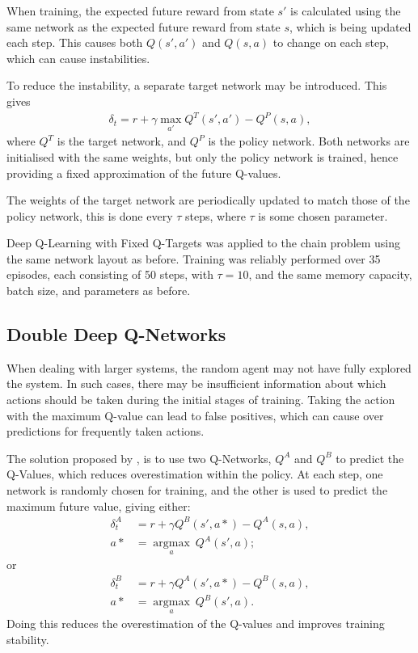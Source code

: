 When training, the expected future reward from state $s'$ is calculated using
the same network as the expected future reward from state $s$, which is being
updated each step.
This causes both $Q(s',a')$ and $Q(s,a)$ to change on each step, which can cause
instabilities.

To reduce the instability, a separate target network may be introduced.
This gives
\begin{align*}
    \delta_t = r + \gamma\max_{a'}Q^T(s',a') - Q^P(s,a),
\end{align*}
where $Q^T$ is the target network, and $Q^P$ is the policy network.
Both networks are initialised with the same weights, but only the policy network
is trained, hence providing a fixed approximation of the future Q-values.

The weights of the target network are periodically updated to match those of the
policy network, this is done every $\tau$ steps, where $\tau$ is some chosen
parameter.

Deep Q-Learning with Fixed Q-Targets was applied to the chain problem using the
same network layout as before.
Training was reliably performed over 35 episodes, each consisting of 50 steps,
with $\tau = 10$, and the same memory capacity, batch size, and parameters as
before.



\subsection{Double Deep Q-Networks}

When dealing with larger systems, the random agent may not have fully explored
the system.
In such cases, there may be insufficient information about which actions should
be taken during the initial stages of training.
Taking the action with the maximum Q-value can lead to false positives, which
can cause over predictions for frequently taken actions.

The solution proposed by \cite{Hasselt:2010:Double}, is to use two Q-Networks,
$Q^A$ and $Q^B$ to predict the Q-Values, which reduces overestimation within the
policy.
At each step, one network is randomly chosen for training, and the other is used
to predict the maximum future value, giving either:
\begin{align*}
    \delta_t^A &= r + \gamma Q^B(s',a*) - Q^A(s,a),\\
    a* &= \underset{a}{\operatorname{argmax}}\ Q^A(s',a);
\end{align*}
or
\begin{align*}
    \delta_t^B &= r + \gamma Q^A(s',a*) - Q^B(s,a),\\
    a* &= \underset{a}{\operatorname{argmax}}\ Q^B(s',a).
\end{align*}
Doing this reduces the overestimation of the Q-values and improves training
stability.

